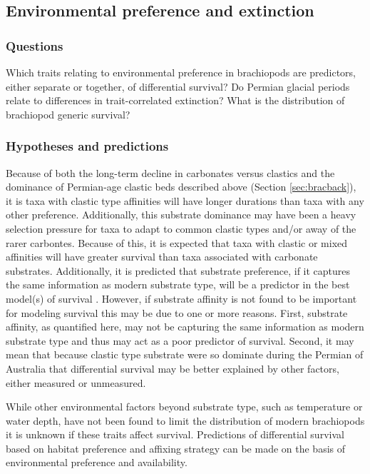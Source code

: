\documentclass[12pt,letterpaper]{article}
\begin{document}
\subsection{Environmental preference and extinction} \label{sec:bracsurv}
\subsubsection{Questions} \label{sec:bracsurvques}
Which traits relating to environmental preference in brachiopods are predictors, either separate or together, of differential survival? Do Permian glacial periods relate to differences in trait-correlated extinction? What is the distribution of brachiopod generic survival?

\subsubsection{Hypotheses and predictions} \label{sec:bracsurvpred}
Because of both the long-term decline in carbonates versus clastics \citep{Peters2008} and the dominance of Permian-age clastic beds \citep{Birgenheier2010,Percival2012,Thomas2007,Fielding2008a,Fielding2008} described above (Section \ref{sec:bracback}), it is taxa with clastic type affinities will have longer durations than taxa with any other preference. Additionally, this substrate dominance may have been a heavy selection pressure for taxa to adapt to common clastic types and/or away of the rarer carbontes. Because of this, it is expected that taxa with clastic or mixed affinities will have greater survival than taxa associated with carbonate substrates. Additionally, it is predicted that substrate preference, if it captures the same information as modern substrate type, will be a predictor in the best model(s) of survival \citep{Richardson1997,Richardson1997a}. However, if substrate affinity is not found to be important for modeling survival this may be due to one or more reasons. First, substrate affinity, as quantified here, may not be capturing the same information as modern substrate type and thus may act as a poor predictor of survival. Second, it may mean that because clastic type substrate were so dominate during the Permian of Australia that differential survival may be better explained by other factors, either measured or unmeasured. 

While other environmental factors beyond substrate type, such as temperature or water depth, have not been found to limit the distribution of modern brachiopods \citep{Richardson1997,Richardson1997a} it is unknown if these traits affect survival. Predictions of differential survival based on habitat preference and affixing strategy can be made on the basis of environmental preference and availability.
\end{document}

